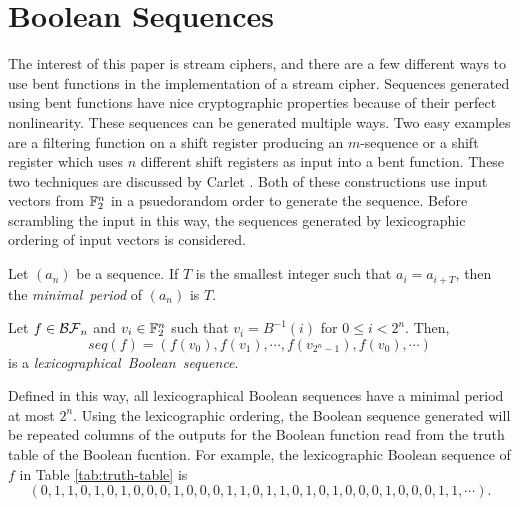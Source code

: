 \section{Boolean Sequences}
\par The interest of this paper is stream ciphers, and there are a few
different ways to use bent functions in the implementation of a stream
cipher. Sequences generated using bent functions have nice cryptographic
properties because of their perfect nonlinearity. These sequences can be
generated multiple ways. Two easy examples are a filtering function on a
shift register producing an $m$-sequence or a shift register which uses $n$
different shift registers as input into a bent function. These two
techniques are discussed by Carlet \cite{col:c06}. Both of these
constructions use input vectors from $\mathbb{F}_2^n$ in a psuedorandom order to
generate the sequence. Before scrambling the input in this way, the
sequences generated by lexicographic ordering of input vectors is
considered.

\begin{definition}
  Let $(a_n)$ be a sequence. If $T$ is the smallest integer such that
  $a_i=a_{i+T}$, then the {\em minimal\ period} of $(a_n)$ is $T$.
\end{definition}

\begin{definition}\label{def:lex-Bool-seq}
  Let $f\in\mathcal{BF}_n$ and $v_i\in\mathbb{F}_2^n$ such that $v_i=B^{-1}(i)$ for
  $0\leq i<2^n$. Then,
  \begin{equation}
    seq(f)=(f(v_0),f(v_1),\cdots,f(v_{2^n-1}),f(v_0),\cdots)
  \end{equation}
  is a {\em lexicographical\ Boolean\ sequence}.
\end{definition}

\par Defined in this way, all lexicographical Boolean sequences have a
minimal period at most $2^n$. Using the lexicographic ordering, the Boolean
sequence generated will be repeated columns of the outputs for the Boolean
function read from the truth table of the Boolean fucntion. For example, the
lexicographic Boolean sequence of $f$ in Table \ref{tab:truth-table} is
\[
(0,1,1,0,1,0,1,0,0,0,1,0,0,0,1,1,0,1,1,0,1,0,1,0,0,0,1,0,0,0,1,1,\cdots).
\]

